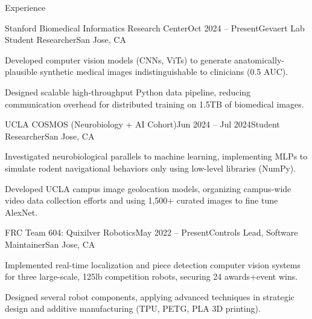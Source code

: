 \documentclass[
  10pt, %
]{resume}
\begin{document}
\sloppy


\begin{rSection}{Experience}


  \begin{rSubsection}{Stanford Biomedical Informatics Research Center}{Oct 2024 -- Present}{Gevaert Lab Student Researcher}{San Jose, CA}
    \item Developed computer vision models (CNNs, ViTs) to generate anatomically-plausible synthetic medical images indistinguishable to clinicians (0.5 AUC).
    \item Designed scalable high-throughput Python data pipeline, reducing communication overhead for distributed training on 1.5TB of biomedical images.
  \end{rSubsection}


  \begin{rSubsection}{UCLA COSMOS (Neurobiology + AI Cohort)}{Jun 2024 -- Jul 2024}{Student Researcher}{San Jose, CA}
    \item Investigated neurobiological parallels to machine learning, implementing MLPs to simulate rodent navigational behaviors only using low-level libraries (NumPy).
    \item Developed UCLA campus image geolocation models, organizing campus-wide video data collection efforts and using 1,500+ curated images to fine tune AlexNet.
  \end{rSubsection}


  \begin{rSubsection}{FRC Team 604: Quixilver Robotics}{May 2022 -- Present}{Controls Lead, Software Maintainer}{San Jose, CA}
    \item Implemented real-time localization and piece detection computer vision systems for three large-scale, 125lb competition robots, securing 24 awards+event wins.
    \item Designed several robot components, applying advanced techniques in strategic design and additive manufacturing (TPU, PETG, PLA 3D printing).
  \end{rSubsection}

\end{rSection}

\end{document}

